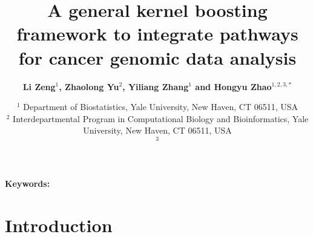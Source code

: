 \documentclass[a4paper,12pt]{article}
\begin{document}
	\title{\bf A general kernel boosting framework to integrate pathways for cancer genomic data analysis}
	\author{\bf Li Zeng$^{1}$, Zhaolong Yu$^2$, Yiliang Zhang$^1$ and Hongyu Zhao$^{1,2,3,*}$}
	\date{
		$^1$ Department of Biostatistics, Yale University, New Haven, CT 06511, USA\\
	$^2$ Interdepartmental Program in Computational Biology and Bioinformatics, Yale University, New Haven, CT 06511, USA\\
	$^3$ 
}
	\maketitle
	\begin{abstract}
		\end{abstract}

		\begin{center}
			\textbf{Keywords:}
			\end{center}

	
	\section{Introduction}
\end{document}
